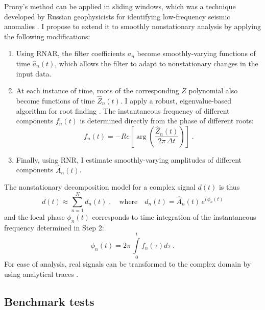 Prony's method can be applied in sliding windows, which was a
technique developed by Russian
geophysicists \cite[]{us,mitrofanov2011} for identifying low-frequency
seismic anomalies \cite[]{SEG-1998-1157}. I propose to extend it to 
smoothly nonstationary analysis by applying the following modifications:
\begin{enumerate}
\item Using RNAR, the filter coefficients $a_n$ become smoothly-varying functions of time $\hat{a}_n(t)$, which allows the filter to adapt to nonstationary changes in the input data. 
\item At each instance of time, roots of the corresponding $Z$ polynomial also become functions of time $\hat{Z}_n(t)$. I apply a robust, eigenvalue-based algorithm for root finding \cite[]{roots}.
The instantaneous frequency of different components $f_n(t)$ is
determined directly from the phase of different roots:
\begin{equation}
\label{eq:group}
f_n(t) = -Re\left[\arg\left(\frac{\hat{Z}_n(t)}{2\pi\,\Delta t}\right)\right]\;.
\end{equation}
\item Finally, using RNR, I estimate smoothly-varying amplitudes of different components $\hat{A}_n(t)$.
\end{enumerate}
The nonstationary decomposition model for a complex signal $d(t)$ is thus
\begin{equation}
  d(t) \approx \sum\limits_{n=1}^{N} d_n(t)\;,\quad\mbox{where}\quad d_n(t) = \hat{A}_n(t)\,e^{i\,\phi_n(t)}
\label{eq:prony}
\end{equation}
and the local phase $\phi_n(t)$ corresponds to time integration of the
instantaneous frequency determined in Step 2:
\begin{equation}
  \phi_n(t) = 2\pi\,\int\limits_{0}^{t} f_n(\tau) d\tau\;.
\label{eq:freq}
\end{equation}
For ease of analysis, real signals can be transformed to the
complex domain by using analytical traces \cite[]{GEO44-06-10411063}.

\subsection{Benchmark tests}




